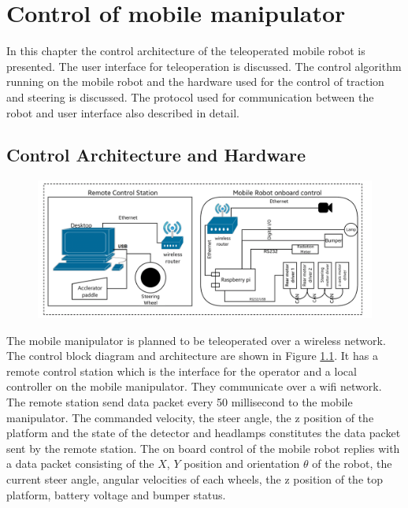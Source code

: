 \chapter{Control of mobile manipulator }
\label{c5_DI2}
In this chapter the control architecture of the teleoperated  mobile robot is presented. The user interface for teleoperation is discussed. The control algorithm  running on the mobile robot and the hardware used for the control of traction and steering is discussed. The protocol used  for communication between the robot and user interface also described in detail.
\section{Control Architecture and Hardware}


\begin{figure}
	\includegraphics[width=\linewidth,keepaspectratio]{Chapter3/fig/controlblock}
	\label{fig:ControlBlockDiag} 
\end{figure} 
The mobile manipulator is planned to be teleoperated over a wireless network. The control block diagram and architecture are shown in Figure \ref{fig:ControlBlockDiag}. It has a remote control station which is the interface for the operator and a local controller on the mobile manipulator. They  communicate over a wifi network. The remote station send data packet every 50 millisecond to the mobile manipulator. The commanded velocity, the steer angle, the z position of the platform and the state of the detector and headlamps constitutes the data packet sent by the remote station. The on board control of the mobile robot replies with a data packet consisting of the $X$, $Y$ position and orientation $\theta$ of the robot, the current steer angle, angular velocities of each wheels, the z position of the top platform,  battery voltage  and bumper status.


